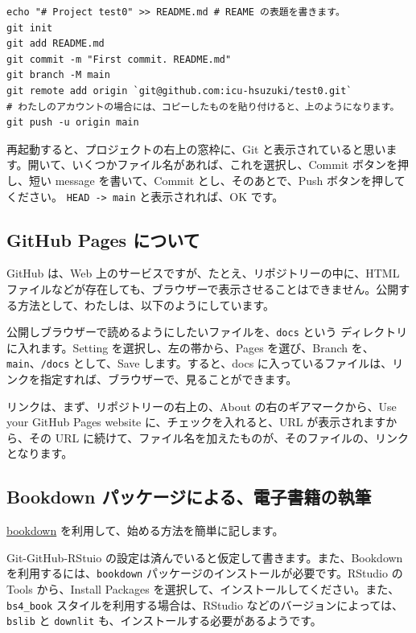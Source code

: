 \documentclass[
  xelatex, ja=standard]{bxjsbook}
\theoremstyle{definition}
\theoremstyle{definition}
\theoremstyle{definition}
\theoremstyle{definition}
\theoremstyle{remark}
\begin{document}
\begin{verbatim}
echo "# Project test0" >> README.md # REAME の表題を書きます。
git init
git add README.md
git commit -m "First commit. README.md"
git branch -M main
git remote add origin `git@github.com:icu-hsuzuki/test0.git`
# わたしのアカウントの場合には、コピーしたものを貼り付けると、上のようになります。
git push -u origin main
\end{verbatim}

再起動すると、プロジェクトの右上の窓枠に、Git と表示されていると思います。開いて、いくつかファイル名があれば、これを選択し、Commit ボタンを押し、短い message を書いて、Commit とし、そのあとで、Push ボタンを押してください。 \texttt{HEAD\ -\textgreater{}\ main} と表示されれば、OK です。

\hypertarget{github-pages-ux306bux3064ux3044ux3066}{%
\subsection{GitHub Pages について}\label{github-pages-ux306bux3064ux3044ux3066}}

GitHub は、Web 上のサービスですが、たとえ、リポジトリーの中に、HTML ファイルなどが存在しても、ブラウザーで表示させることはできません。公開する方法として、わたしは、以下のようにしています。

公開しブラウザーで読めるようにしたいファイルを、\texttt{docs} という ディレクトリに入れます。Setting を選択し、左の帯から、Pages を選び、Branch を、\texttt{main}、\texttt{/docs} として、Save します。すると、docs に入っているファイルは、リンクを指定すれば、ブラウザーで、見ることができます。

リンクは、まず、リポジトリーの右上の、About の右のギアマークから、Use your GitHub Pages website に、チェックを入れると、URL が表示されますから、その URL に続けて、ファイル名を加えたものが、そのファイルの、リンクとなります。

\hypertarget{bookdown-ux30d1ux30c3ux30b1ux30fcux30b8ux306bux3088ux308bux96fbux5b50ux66f8ux7c4dux306eux57f7ux7b46}{%
\subsection{Bookdown パッケージによる、電子書籍の執筆}\label{bookdown-ux30d1ux30c3ux30b1ux30fcux30b8ux306bux3088ux308bux96fbux5b50ux66f8ux7c4dux306eux57f7ux7b46}}

\href{https://github.com/rstudio/bookdown}{bookdown} を利用して、始める方法を簡単に記します。

Git-GitHub-RStuio の設定は済んでいると仮定して書きます。また、Bookdown を利用するには、\texttt{bookdown} パッケージのインストールが必要です。RStudio の Tools から、Install Packages を選択して、インストールしてください。また、\texttt{bs4\_book} スタイルを利用する場合は、RStudio などのバージョンによっては、\texttt{bslib} と \texttt{downlit} も、インストールする必要があるようです。
\end{document}
